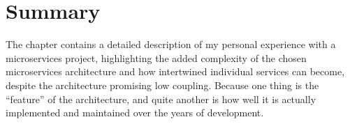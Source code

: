 \section{Summary}
The chapter contains a detailed description of my personal experience with a microservices project, highlighting the added complexity of the chosen microservices architecture and how intertwined individual services can become, despite the architecture promising low coupling. Because one thing is the ``feature'' of the architecture, and quite another is how well it is actually implemented and maintained over the years of development.






